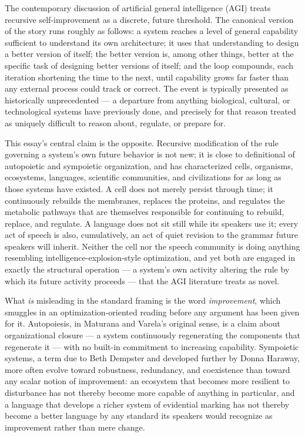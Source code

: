\documentclass[12pt,a4paper]{article}
\theoremstyle{plain}
\theoremstyle{definition}
\theoremstyle{remark}
\begin{document}
The contemporary discussion of artificial general intelligence (AGI) treats recursive self-improvement as a discrete, future threshold. The canonical version of the story runs roughly as follows: a system reaches a level of general capability sufficient to understand its own architecture; it uses that understanding to design a better version of itself; the better version is, among other things, better at the specific task of designing better versions of itself; and the loop compounds, each iteration shortening the time to the next, until capability grows far faster than any external process could track or correct. The event is typically presented as historically unprecedented — a departure from anything biological, cultural, or technological systems have previously done, and precisely for that reason treated as uniquely difficult to reason about, regulate, or prepare for.

This essay's central claim is the opposite. Recursive modification of the rule governing a system's own future behavior is not new; it is close to definitional of autopoietic and sympoietic organization, and has characterized cells, organisms, ecosystems, languages, scientific communities, and civilizations for as long as those systems have existed. A cell does not merely persist through time; it continuously rebuilds the membranes, replaces the proteins, and regulates the metabolic pathways that are themselves responsible for continuing to rebuild, replace, and regulate. A language does not sit still while its speakers use it; every act of speech is also, cumulatively, an act of quiet revision to the grammar future speakers will inherit. Neither the cell nor the speech community is doing anything resembling intelligence-explosion-style optimization, and yet both are engaged in exactly the structural operation — a system's own activity altering the rule by which its future activity proceeds — that the AGI literature treats as novel.

What \emph{is} misleading in the standard framing is the word \emph{improvement}, which smuggles in an optimization-oriented reading before any argument has been given for it. Autopoiesis, in Maturana and Varela's original sense, is a claim about organizational closure — a system continuously regenerating the components that regenerate it — with no built-in commitment to increasing capability. Sympoietic systems, a term due to Beth Dempster and developed further by Donna Haraway, more often evolve toward robustness, redundancy, and coexistence than toward any scalar notion of improvement: an ecosystem that becomes more resilient to disturbance has not thereby become more capable of anything in particular, and a language that develops a richer system of evidential marking has not thereby become a better language by any standard its speakers would recognize as improvement rather than mere change.
\end{document}
